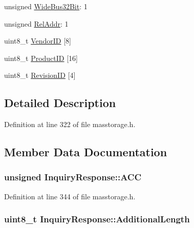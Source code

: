 \begin{DoxyCompactItemize}
\item 
unsigned \hyperlink{struct_inquiry_response_a78c6cf3387430de8176b006c4915be63}{\-Wide\-Bus32\-Bit}\-: 1
\item 
unsigned \hyperlink{struct_inquiry_response_a64121510090cb38926bbb321e98b1a13}{\-Rel\-Addr}\-: 1
\item 
uint8\-\_\-t \hyperlink{struct_inquiry_response_acc610ff84bef225f8826585725ad9802}{\-Vendor\-I\-D} \mbox{[}8\mbox{]}
\item 
uint8\-\_\-t \hyperlink{struct_inquiry_response_a02c12d5c3f7b9e821c6f28dc827f5629}{\-Product\-I\-D} \mbox{[}16\mbox{]}
\item 
uint8\-\_\-t \hyperlink{struct_inquiry_response_a23775c8cb582ae07c78449dc1a08c23e}{\-Revision\-I\-D} \mbox{[}4\mbox{]}
\end{DoxyCompactItemize}


\subsection{\-Detailed \-Description}


\-Definition at line 322 of file masstorage.\-h.



\subsection{\-Member \-Data \-Documentation}
\hypertarget{struct_inquiry_response_a5b8449c749fe6290adc3bf0901697fbb}{
\subsubsection[{\-A\-C\-C}]{\setlength{\rightskip}{0pt plus 5cm}unsigned {\bf \-Inquiry\-Response\-::\-A\-C\-C}}}\label{struct_inquiry_response_a5b8449c749fe6290adc3bf0901697fbb}


\-Definition at line 344 of file masstorage.\-h.

\hypertarget{struct_inquiry_response_abf1bb662cae5c4d2c2e4dbb454f92e91}{
\subsubsection[{\-Additional\-Length}]{\setlength{\rightskip}{0pt plus 5cm}uint8\-\_\-t {\bf \-Inquiry\-Response\-::\-Additional\-Length}}}\label{struct_inquiry_response_abf1bb662cae5c4d2c2e4dbb454f92e91}


